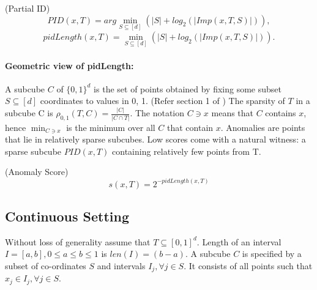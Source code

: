 \begin{defn}
    \label{defn:partial-ids}
    (Partial ID) 
    \vspace{-1em}
    \begin{equation}
        \label{eq:PID}
        PID(x,T) = arg \min_{S \subseteq [d]} 
    (\vert S \vert + log_{2}(\vert Imp(x, T, S) \vert)),
    \end{equation}
    \vspace{-2em}
    \begin{equation}
        \label{eq:pidLength}
        pidLength(x,T) = \min_{S \subseteq [d]} 
    (\vert S \vert + log_{2}(\vert Imp(x, T, S) \vert)).
    \end{equation}
\end{defn}


\paragraph{Geometric view of pidLength: } 
A subcube $C$ of $\{0, 1\}^d$ is the set of points obtained by fixing some subset $S \subseteq [d]$ coordinates to values in 0, 1. (Refer section 1 of \cite{ellis_2011})
The sparsity of $T$ in a subcube C is $\rho_{0,1}(T, C) = \frac{\vert C \vert}{\vert C \cap T\vert}$. 
The notation $C \ni x$ means that $C$ contains $x$, hence $\min_{C \ni x}$ is the minimum over all $C$ that contain $x$. Anomalies are points that lie in relatively sparse subcubes. Low scores come with a natural witness: a sparse subcube $PID(x, T)$ containing relatively few points from T.

\begin{defn}
    \label{defn:pidforest-anomaly-score}
    (Anomaly Score)
    \vspace{-1em}
    \begin{equation}
        \label{eq:pidforest-anomaly-score}
        s(x,T) = 2^{-pidLength(x,T)}
    \end{equation}
\end{defn}

\subsection{Continuous Setting}

Without loss of generality assume that $T \subseteq [0,1]^d$. 
Length of an interval $I = [a,b], 0 \leq a \leq b \leq 1$ is $len(I) = (b-a)$. 
A subcube $C$ is specified by a subset of co-ordinates $S$ and intervals $I_j, \forall j \in S$. 
It consists of all points such that $x_j \in I_j, \forall j \in S$. 

